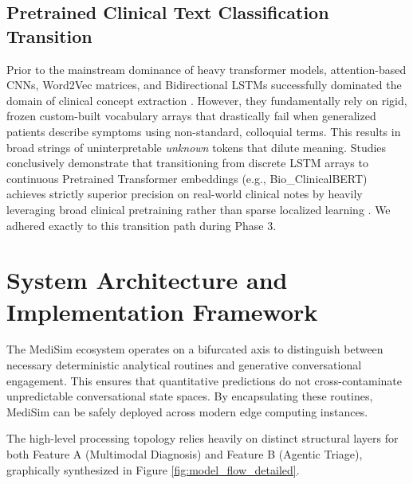 \documentclass[11pt,a4paper]{article}
\begin{document}
\subsection{Pretrained Clinical Text Classification Transition}
Prior to the mainstream dominance of heavy transformer models, attention-based CNNs, Word2Vec matrices, and Bidirectional LSTMs successfully dominated the domain of clinical concept extraction \citep{mullenbach2018explainable}. However, they fundamentally rely on rigid, frozen custom-built vocabulary arrays that drastically fail when generalized patients describe symptoms using non-standard, colloquial terms. This results in broad strings of uninterpretable \textit{unknown} tokens that dilute meaning. Studies conclusively demonstrate that transitioning from discrete LSTM arrays to continuous Pretrained Transformer embeddings (e.g., Bio\_ClinicalBERT) achieves strictly superior precision on real-world clinical notes by heavily leveraging broad clinical pretraining rather than sparse localized learning \citep{girardi2018patient}. We adhered exactly to this transition path during Phase 3.


\section{System Architecture and Implementation Framework}

The MediSim ecosystem operates on a bifurcated axis to distinguish between necessary deterministic analytical routines and generative conversational engagement. This ensures that quantitative predictions do not cross-contaminate unpredictable conversational state spaces. By encapsulating these routines, MediSim can be safely deployed across modern edge computing instances.

The high-level processing topology relies heavily on distinct structural layers for both Feature A (Multimodal Diagnosis) and Feature B (Agentic Triage), graphically synthesized in Figure \ref{fig:model_flow_detailed}.
\end{document}
